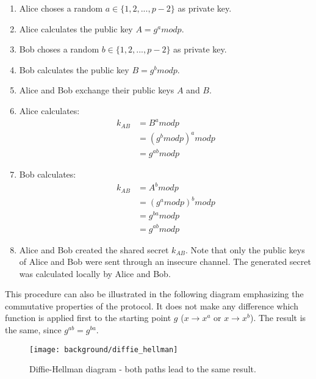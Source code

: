 \begin{enumerate}
\item Alice choses a random $a \in \{1, 2, ... , p-2\}$ as private key. 
\item Alice calculates the public key $A = g^a mod p$.
\item Bob choses a random $b \in \{1, 2, ... , p-2\}$ as private key. 
\item Bob calculates the public key $B = g^b mod p$.
\item Alice and Bob exchange their public keys $A$ and $B$.
\item Alice calculates: 
\begin{equation}
\begin{split}
k_{AB} & = B^a mod p \\
 & = (g^b mod p)^a mod p \\
 & = g^{a b} mod p
\end{split}
\end{equation}
\item Bob calculates: 
\begin{equation}
\begin{split}
k_{AB} & = A^b mod p \\
 & = (g^a mod p)^b mod p \\
 & = g^{b a} mod p \\
 & = g^{a b} mod p
\end{split}
\end{equation}
\item Alice and Bob created the shared secret $k_{AB}$. Note that only the public keys of Alice and Bob were sent through an insecure channel. The generated secret was calculated locally by Alice and Bob.
\end{enumerate}
This procedure can also be illustrated in the following diagram emphasizing the commutative properties of the protocol. It does not make any difference which function is applied first to the starting point $g$ ($x \to x^a$ or $x \to x^b$). The result is the same, since $g^{ab} = g^{ba}$.

\begin{figure}[htpb]
  \centering
  \texttt{[image: background/diffie\_hellman]}
  \caption[Diffie-Hellman diagram]{Diffie-Hellman diagram - both paths lead to the same result.}
  \label{fig:diffie_hellman}
\end{figure}

